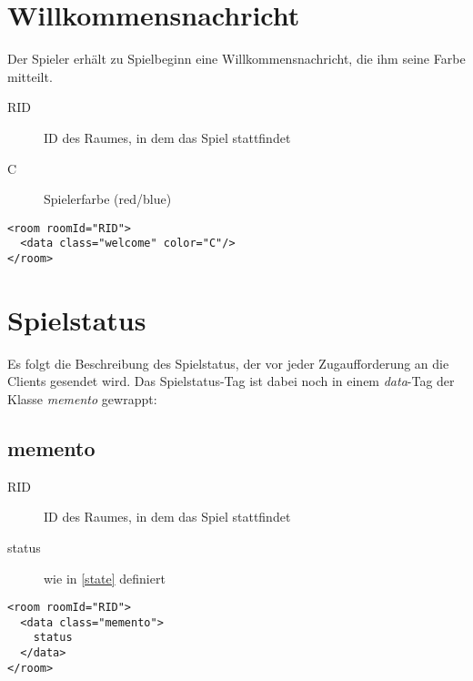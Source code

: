 \documentclass[12pt,a4paper, ngerman, oneside]{scrartcl}
\begin{document}
\section{Willkommensnachricht}
Der Spieler erhält zu Spielbeginn eine Willkommensnachricht, die ihm seine Farbe mitteilt.
\begin{description}
\item[RID] ID des Raumes, in dem das Spiel stattfindet
\item[C] Spielerfarbe (red/blue)
\end{description}
\begin{verbatim}
<room roomId="RID">
  <data class="welcome" color="C"/>
</room>
\end{verbatim}

\section{Spielstatus}
Es folgt die Beschreibung des Spielstatus, der vor jeder Zugaufforderung an die Clients gesendet wird. Das Spielstatus-Tag ist dabei noch in einem \textit{data}-Tag der Klasse \textit{memento} gewrappt:
\subsection{memento}
\begin{description}
\item[RID] ID des Raumes, in dem das Spiel stattfindet
\item[status] wie in \ref{state} definiert
\end{description}
\begin{verbatim}
<room roomId="RID"> 
  <data class="memento"> 
  	status
  </data> 
</room>
\end{verbatim}
\end{document}
